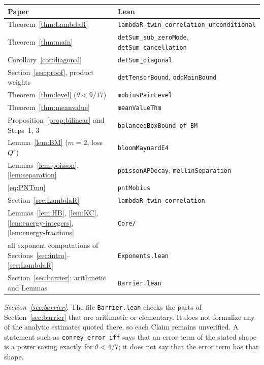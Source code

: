 \documentclass[11pt]{amsart}
\theoremstyle{definition}
\theoremstyle{remark}
\numberwithin{equation}{section}
\newcommand{\eps}{\varepsilon}
\begin{document}
\medskip
\begin{center}
\begin{tabular}{ll}
Paper & Lean \\ \hline
Theorem~\ref{thm:LambdaR} & \texttt{lambdaR\_twin\_correlation\_unconditional}\\
Theorem~\ref{thm:main} & \texttt{detSum\_sub\_zeroMode}, \texttt{detSum\_cancellation}\\
Corollary~\ref{cor:diagonal} & \texttt{detSum\_diagonal}\\
Section~\ref{sec:proof}, product weights & \texttt{detTensorBound}, \texttt{oddMainBound}\\
Theorem~\ref{thm:level} ($\theta<9/17$) & \texttt{mobiusPairLevel}\\
Theorem~\ref{thm:meanvalue} & \texttt{meanValueThm}\\
Proposition~\ref{prop:bilinear} and Steps~1, 3 & \texttt{balancedBoxBound\_of\_BM}\\
Lemma~\ref{lem:BM} ($m=2$, loss $Q^\eps$) & \texttt{bloomMaynardE4}\\
Lemmas~\ref{lem:poisson}, \ref{lem:separation} & \texttt{poissonAPDecay}, \texttt{mellinSeparation}\\
\eqref{eq:PNTmu} & \texttt{pntMobius}\\
Section~\ref{sec:LambdaR} & \texttt{lambdaR\_twin\_correlation}\\
Lemmas~\ref{lem:HB}, \ref{lem:KC}, \ref{lem:energy-integers}, \ref{lem:energy-fractions} & \texttt{Core/}\\
all exponent computations of Sections~\ref{sec:intro}--\ref{sec:LambdaR} & \texttt{Exponents.lean}\\
Section~\ref{sec:barrier}: arithmetic and Lemmas & \texttt{Barrier.lean}
\end{tabular}
\end{center}
\medskip

\emph{Section~\ref{sec:barrier}.}  The file \texttt{Barrier.lean} checks the
parts of Section~\ref{sec:barrier} that are arithmetic or elementary.  It
does not formalize any of the analytic estimates quoted there, so each
Claim remains unverified.  A statement such as \texttt{conrey\_error\_iff}
says that an error term of the stated shape is a power saving exactly for
$\theta<4/7$; it does not say that the error term has that shape.
\end{document}
